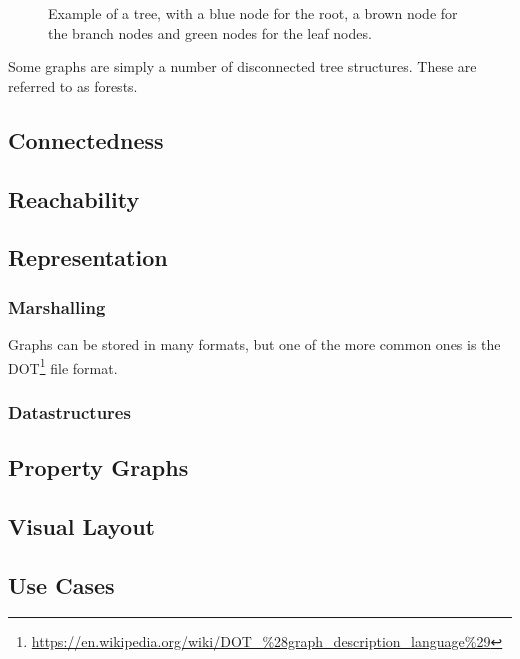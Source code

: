 \begin{figure}[tbp]
\begin{center}
  \end{center}
  \caption[Example of a tree.]{Example of a tree, with a blue node for the root, a brown node for the branch nodes and green nodes for the leaf nodes.}
  \label{fig:topics:graphs:example:tree}
\end{figure}


Some graphs are simply a number of disconnected tree structures. These are referred to as forests.

\subsection{Connectedness}

\subsection{Reachability}

\subsection{Representation}
\subsubsection{Marshalling}

Graphs can be stored in many formats, but one of the more common ones is the DOT\footnote{ \url{https://en.wikipedia.org/wiki/DOT_\%28graph_description_language\%29} } file format.

\subsubsection{Datastructures}

\subsection{Property Graphs}

\subsection{Visual Layout}

\subsection{Use Cases}

\begin{itemize}
\end{itemize}

